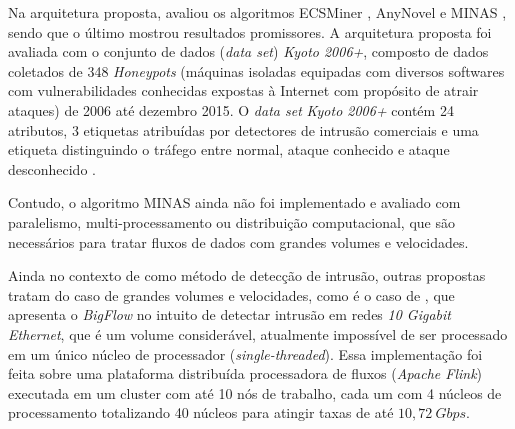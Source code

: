 Na arquitetura proposta,  avaliou os algoritmos
ECSMiner \cite{Masud2010ECSMiner}, AnyNovel \cite{Abdallah2016anynovel} e MINAS
\cite{Faria2016minas}, sendo que o último mostrou resultados promissores.
A arquitetura proposta foi avaliada com o conjunto de dados (\emph{data set}) \emph{Kyoto 2006+},
composto de dados coletados de 348 \emph{Honeypots} (máquinas isoladas equipadas com diversos softwares
com vulnerabilidades conhecidas expostas à Internet com propósito de atrair
ataques) de 2006 até dezembro 2015.
O \emph{data set} \emph{Kyoto 2006+} contém 24 atributos, 3 etiquetas atribuídas por
detectores de intrusão comerciais e uma etiqueta
distinguindo o tráfego entre normal, ataque conhecido e ataque desconhecido
\cite{Cassales2019a}.

Contudo, o algoritmo MINAS ainda não foi implementado e avaliado com paralelismo,
multi-processamento ou distribuição computacional, que são necessários para
tratar fluxos de dados com grandes volumes e velocidades.

Ainda no contexto de \nd como método de detecção de intrusão,
outras propostas tratam do caso de grandes volumes e velocidades, como é o caso
de , que apresenta o \emph{BigFlow} no intuito de detectar
intrusão em redes \emph{10 Gigabit Ethernet}, que é um volume considerável,
atualmente impossível de ser processado em um único núcleo de processador
(\emph{single-threaded}).
Essa implementação foi feita sobre uma plataforma
distribuída processadora de fluxos (\emph{Apache Flink}) executada em um cluster
com até 10 nós de trabalho, cada um com 4 núcleos de processamento totalizando
40 núcleos para atingir taxas de até $10,72 \ Gbps$.


